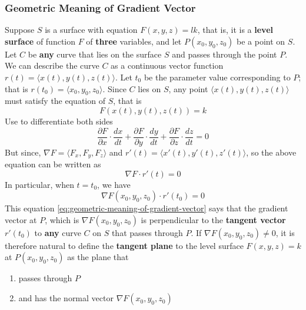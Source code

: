 \documentclass[math,code]{amznotes}
\theoremstyle{remark}
\begin{document}
\subsubsection{Geometric Meaning of Gradient Vector}
Suppose $S$ is a surface with equation $F(x,y,z)=lk$, that is, it is a {\color{red} \textbf{level surface}} of function $F$ of {\color{red} \textbf{three}} variables, and let $P(x_0,y_0,z_0)$ be a point on $S$. Let $C$ be {\color{red} \textbf{any}} curve that lies on the surface $S$ and passes through the point $P$. We can describe the curve $C$ as a continuous vector function $r(t)=\langle x(t), y(t), z(t) \rangle$. Let $t_0$ be the parameter  value corresponding to $P$; that is $r(t_0)=\langle x_0, y_0, z_0 \rangle$. Since $C$ lies on $S$, any point $\langle x(t), y(t), z(t) \rangle$ must satisfy the equation of $S$, that is
\begin{displaymath}
    F(x(t), y(t), z(t))=k
\end{displaymath}
Use  to differentiate both sides
\begin{displaymath}
    \frac{\partial F}{\partial x} \cdot \frac{dx}{dt} + \frac{\partial F}{\partial y} \cdot \frac{dy}{dt} + \frac{\partial F}{\partial z} \cdot \frac{dz}{dt} = 0
\end{displaymath}
But since, $\nabla F = \langle F_x, F_y, F_z \rangle$ and $r'(t) = \langle x'(t), y'(t), z'(t) \rangle$, so the above equation can be written as
\begin{displaymath}
    \nabla F \cdot r'(t) = 0
\end{displaymath}
In particular, when $t=t_0$, we have
\begin{equation} \label{eq:geometric-meaning-of-gradient-vector}
    \nabla F(x_0,y_0,z_0) \cdot r'(t_0) = 0
\end{equation}
This equation \eqref{eq:geometric-meaning-of-gradient-vector} says that the gradient vector at $P$, which is $\nabla F(x_0,y_0,z_0)$ is perpendicular to the {\color{red} \textbf{tangent vector}} $r'(t_0)$ to {\color{red} \textbf{any}} curve $C$ on $S$ that passes through $P$. If $\nabla F(x_0,y_0,z_0) \neq 0$, it is therefore natural to define the {\color{red} \textbf{tangent plane}} to the level surface $F(x,y,z) = k$ at $P(x_0,y_0,z_0)$ as the plane that
\begin{enumerate}
    \item passes through $P$
    \item and has the normal vector $\nabla F(x_0,y_0,z_0)$
\end{enumerate}
\end{document}
